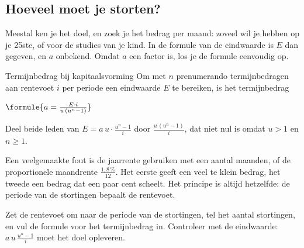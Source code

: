 \subsection{Hoeveel moet je storten?}

Meestal ken je het doel, en zoek je het bedrag per maand: zoveel wil je hebben op je 25ste, of voor de studies van je kind. In de formule van de eindwaarde is $E$ dan gegeven, en $a$ onbekend. Omdat $a$ een factor is, los je de formule eenvoudig op.

\begin{theorie}
\begin{stelling}{Termijnbedrag bij kapitaalsvorming}
Om met $n$ prenumerando termijnbedragen aan rentevoet $i$ per periode een eindwaarde $E$ te bereiken, is het termijnbedrag

\vspace{1mm}
\qquad $\formule{a = \frac{E \cdot i}{u\,(u^n - 1)}}$
\end{stelling}

\begin{bewijs}
Deel beide leden van $E = a\,u \cdot \frac{u^n - 1}{i}$ door $\frac{u\,(u^n - 1)}{i}$, dat niet nul is omdat $u > 1$ en $n \geqslant 1$.
\end{bewijs}
\end{theorie}


Een veelgemaakte fout is de jaarrente gebruiken met een aantal maanden, of de proportionele maandrente $\frac{1{,}8\,\%}{12}$. Het eerste geeft een veel te klein bedrag, het tweede een bedrag dat een paar cent scheelt. Het principe is altijd hetzelfde: de periode van de stortingen bepaalt de rentevoet.

\begin{werkwijze}
Zet de rentevoet om naar de periode van de stortingen, tel het aantal stortingen, en vul de formule voor het termijnbedrag in. Controleer met de eindwaarde: $a\,u\,\frac{u^n - 1}{i}$ moet het doel opleveren.
\end{werkwijze}

